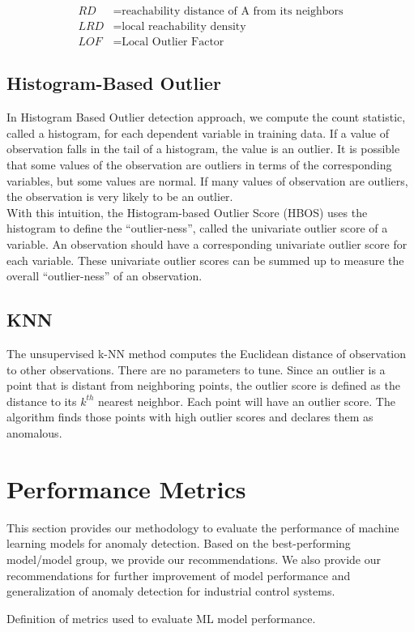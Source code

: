 \documentclass{article}
\begin{document}
\begin{align*}
RD &= \text{reachability distance of A from its neighbors} \\
LRD &= \text{local reachability density} \\
LOF &= \text{Local Outlier Factor}
\end{align*}

\subsection{Histogram-Based Outlier}
In Histogram Based Outlier\cite{nine} detection approach, we compute the count statistic, called a histogram, for each dependent variable in training data. If a value of observation falls in the tail of a histogram, the value is an outlier. It is possible that some values of the observation are outliers in terms of the corresponding variables, but some values are normal. If many values of observation are outliers, the observation is very likely to be an outlier. \\
With this intuition, the Histogram-based Outlier Score (HBOS) uses the histogram to define the “outlier-ness”, called the univariate outlier score of a variable. An observation should have a corresponding univariate outlier score for each variable. These univariate outlier scores can be summed up to measure the overall “outlier-ness” of an observation.

\subsection{KNN}
The unsupervised k-NN \cite{ten} method computes the Euclidean distance of observation to other observations. There are no parameters to tune. Since an outlier is a point that is distant from neighboring points, the outlier score is defined as the distance to its $k^{th}$ nearest neighbor. Each point will have an outlier score. The algorithm finds those points with high outlier scores and declares them as anomalous.


\section{Performance Metrics} 
This section provides our methodology to evaluate the performance of machine learning models for anomaly detection. Based on the best-performing model/model group, we provide our recommendations. We also provide our recommendations for further improvement of model performance and generalization of anomaly detection for industrial control systems. \par
Definition of metrics used to evaluate ML model performance. \par
\end{document}
